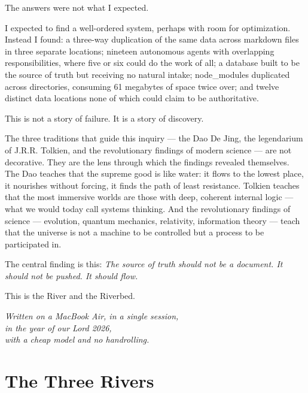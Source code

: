 \documentclass[12pt,a4paper,oneside]{book}
\begin{document}
The answers were not what I expected.

I expected to find a well-ordered system, perhaps with room for optimization. Instead I found: a three-way duplication of the same data across markdown files in three separate locations; nineteen autonomous agents with overlapping responsibilities, where five or six could do the work of all; a database built to be the source of truth but receiving no natural intake; node\_modules duplicated across directories, consuming 61 megabytes of space twice over; and twelve distinct data locations none of which could claim to be authoritative.

This is not a story of failure. It is a story of discovery.

The three traditions that guide this inquiry --- the Dao De Jing, the legendarium of J.R.R. Tolkien, and the revolutionary findings of modern science --- are not decorative. They are the lens through which the findings revealed themselves. The Dao teaches that the supreme good is like water: it flows to the lowest place, it nourishes without forcing, it finds the path of least resistance. Tolkien teaches that the most immersive worlds are those with deep, coherent internal logic --- what we would today call systems thinking. And the revolutionary findings of science --- evolution, quantum mechanics, relativity, information theory --- teach that the universe is not a machine to be controlled but a process to be participated in.

The central finding is this: \emph{The source of truth should not be a document. It should not be pushed. It should flow.}

This is the River and the Riverbed.

\begin{flushright}
\small\itshape
Written on a MacBook Air, in a single session,\\
in the year of our Lord 2026,\\
with a cheap model and no handrolling.
\end{flushright}

\tableofcontents

\part{The Three Rivers}
\label{part:three-rivers}
\end{document}
